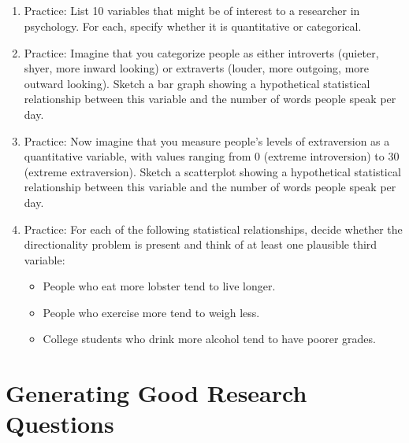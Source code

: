\subsection{}
\begin{fullwidth}
\begin{enumerate}
\item Practice: List 10 variables that might be of interest to a researcher in psychology. For each, specify whether it is quantitative or categorical.
\item Practice: Imagine that you categorize people as either introverts (quieter, shyer, more inward looking) or extraverts (louder, more outgoing, more outward looking). Sketch a bar graph showing a hypothetical statistical relationship between this variable and the number of words people speak per day.
\item Practice: Now imagine that you measure people's levels of extraversion as a quantitative variable, with values ranging from 0 (extreme introversion) to 30 (extreme extraversion). Sketch a scatterplot showing a hypothetical statistical relationship between this variable and the number of words people speak per day.
\item Practice: For each of the following statistical relationships, decide whether the directionality problem is present and think of at least one plausible third variable:
\begin{itemize}
\item People who eat more lobster tend to live longer.
\item People who exercise more tend to weigh less.
\item College students who drink more alcohol tend to have poorer grades.
\end{itemize}
\end{enumerate}
\end{fullwidth}
  
\newpage
\section{Generating Good Research Questions}


